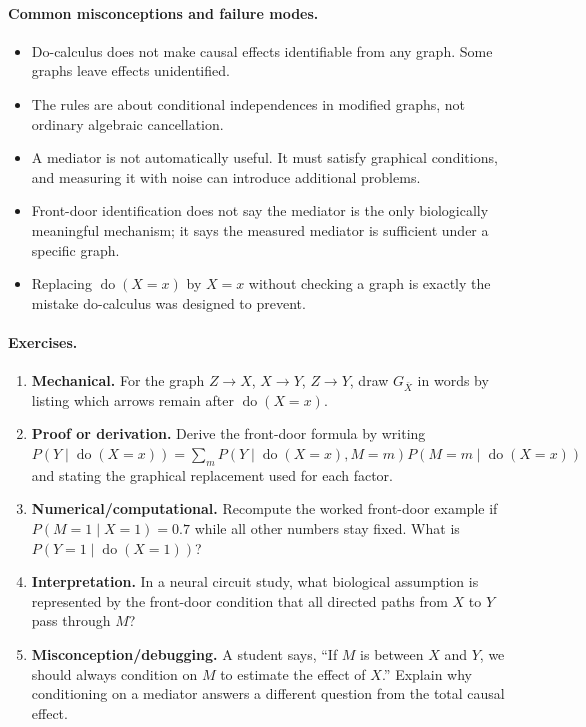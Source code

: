 \paragraph{Common misconceptions and failure modes.}
\begin{itemize}[leftmargin=*]
\item Do-calculus does not make causal effects identifiable from any graph. Some graphs leave effects unidentified.
\item The rules are about conditional independences in modified graphs, not ordinary algebraic cancellation.
\item A mediator is not automatically useful. It must satisfy graphical conditions, and measuring it with noise can introduce additional problems.
\item Front-door identification does not say the mediator is the only biologically meaningful mechanism; it says the measured mediator is sufficient under a specific graph.
\item Replacing \(\operatorname{do}(X=x)\) by \(X=x\) without checking a graph is exactly the mistake do-calculus was designed to prevent.
\end{itemize}

\paragraph{Exercises.}
\begin{enumerate}[label=\textbf{19.2.\arabic*.}, leftmargin=*]
\item \textbf{Mechanical.} For the graph \(Z\to X\), \(X\to Y\), \(Z\to Y\), draw \(G_{\bar X}\) in words by listing which arrows remain after \(\operatorname{do}(X=x)\).
\item \textbf{Proof or derivation.} Derive the front-door formula by writing \(P(Y\mid \operatorname{do}(X=x))=\sum_m P(Y\mid \operatorname{do}(X=x),M=m)P(M=m\mid \operatorname{do}(X=x))\) and stating the graphical replacement used for each factor.
\item \textbf{Numerical/computational.} Recompute the worked front-door example if \(P(M=1\mid X=1)=0.7\) while all other numbers stay fixed. What is \(P(Y=1\mid \operatorname{do}(X=1))\)?
\item \textbf{Interpretation.} In a neural circuit study, what biological assumption is represented by the front-door condition that all directed paths from \(X\) to \(Y\) pass through \(M\)?
\item \textbf{Misconception/debugging.} A student says, ``If \(M\) is between \(X\) and \(Y\), we should always condition on \(M\) to estimate the effect of \(X\).'' Explain why conditioning on a mediator answers a different question from the total causal effect.
\end{enumerate}

